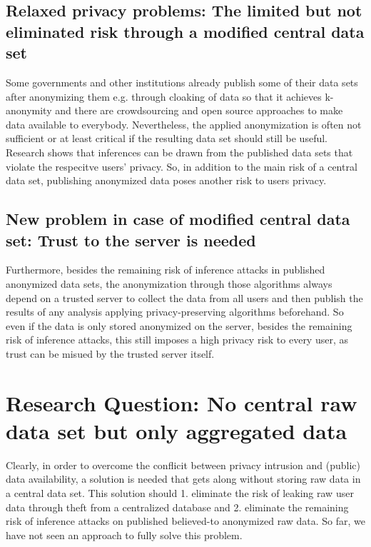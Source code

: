 \subsection{Relaxed privacy problems: The limited but not eliminated risk through a modified central data set}

Some governments and other institutions already publish some of their data sets after anonymizing them e.g. through cloaking of data so that it achieves k-anonymity and there are crowdsourcing and open source approaches to make
data available to everybody. 
Nevertheless, the applied anonymization is often not sufficient or at least critical if the resulting data set should still be useful. Research shows that inferences can be drawn from the published data sets that violate the respecitve users' privacy. So, in addition to the main risk of a central data set, publishing anonymized data poses another risk to users privacy.

\subsection{New problem in case of modified central data set: Trust to the server is needed}

Furthermore, besides the remaining risk of inference attacks in published anonymized data sets, the anonymization through those algorithms always depend on a trusted server to collect the data from all users and then publish the results of any analysis applying privacy-preserving algorithms beforehand. So even if the data is only stored anonymized on the server, besides the remaining risk of inference attacks, this still imposes a high privacy risk to every user, as trust can be misued by the trusted server itself.

\section{Research Question: No central raw data set but only aggregated data}
Clearly, in order to overcome the conflicit between privacy intrusion and (public) data availability, a solution is needed that gets along without storing raw data in a central data set.
This solution should 1. eliminate the risk of leaking raw user data through theft from a centralized database and 2. eliminate the remaining risk of inference attacks on published believed-to anonymized raw data. So far, we have not seen an approach to fully solve this problem.

